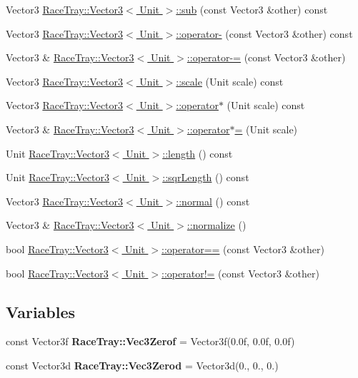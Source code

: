 \begin{DoxyCompactItemize}
Vector3 \hyperlink{group___math_ga76645af9d0562c9964fcd0850a327288}{Race\-Tray\-::\-Vector3$<$ Unit $>$\-::sub} (const Vector3 \&other) const 
\item 
Vector3 \hyperlink{group___math_gaa69c327bce74c6fccc67732aa72d51e4}{Race\-Tray\-::\-Vector3$<$ Unit $>$\-::operator-\/} (const Vector3 \&other) const 
\item 
Vector3 \& \hyperlink{group___math_gae0287f848b8e46e8e2abbaa1a8940f9d}{Race\-Tray\-::\-Vector3$<$ Unit $>$\-::operator-\/=} (const Vector3 \&other)
\item 
Vector3 \hyperlink{group___math_ga9282288d74a882eb1b049abc21f8b0c7}{Race\-Tray\-::\-Vector3$<$ Unit $>$\-::scale} (Unit scale) const 
\item 
Vector3 \hyperlink{group___math_ga89a8462c9f9c3802cbc7092f234e9a04}{Race\-Tray\-::\-Vector3$<$ Unit $>$\-::operator$\ast$} (Unit scale) const 
\item 
Vector3 \& \hyperlink{group___math_gaf2ead3fae3ec911d2d0ece2c88f0488c}{Race\-Tray\-::\-Vector3$<$ Unit $>$\-::operator$\ast$=} (Unit scale)
\item 
Unit \hyperlink{group___math_ga060ae22a7ea4202c7d401bbcb0c0732d}{Race\-Tray\-::\-Vector3$<$ Unit $>$\-::length} () const 
\item 
Unit \hyperlink{group___math_ga0642d7d561ce609f96b1df8ad6c8bb8a}{Race\-Tray\-::\-Vector3$<$ Unit $>$\-::sqr\-Length} () const 
\item 
Vector3 \hyperlink{group___math_ga822111c5601c2d6b8dab069acd2df835}{Race\-Tray\-::\-Vector3$<$ Unit $>$\-::normal} () const 
\item 
Vector3 \& \hyperlink{group___math_ga606bb7deceeda5a9cab17e22e1aed668}{Race\-Tray\-::\-Vector3$<$ Unit $>$\-::normalize} ()
\item 
bool \hyperlink{group___math_gacc0738d9f3ef7de9deb35b27472e6397}{Race\-Tray\-::\-Vector3$<$ Unit $>$\-::operator==} (const Vector3 \&other)
\item 
bool \hyperlink{group___math_ga618208f396f28328642826f06fcab560}{Race\-Tray\-::\-Vector3$<$ Unit $>$\-::operator!=} (const Vector3 \&other)
\end{DoxyCompactItemize}
\subsection*{Variables}
\begin{DoxyCompactItemize}
\item 
\hypertarget{group___math_ga8d3973ce6918cf08abf046cc763886ca}{const Vector3f {\bfseries Race\-Tray\-::\-Vec3\-Zerof} = Vector3f(0.\-0f, 0.\-0f, 0.\-0f)}\label{group___math_ga8d3973ce6918cf08abf046cc763886ca}

\item 
\hypertarget{group___math_gad344ee7babbd87315c3394b37c288a1a}{const Vector3d {\bfseries Race\-Tray\-::\-Vec3\-Zerod} = Vector3d(0., 0., 0.)}\label{group___math_gad344ee7babbd87315c3394b37c288a1a}

\end{DoxyCompactItemize}


